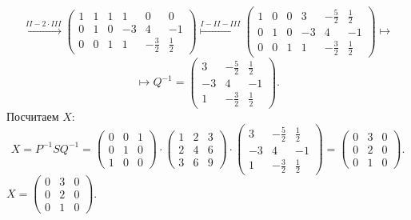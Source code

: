 \documentclass[a4paper,12pt]{article}
\begin{document}
$$ 
\overset{II - 2\cdot III}{\longmapsto}
\left(
\begin{array}{ccc|ccc}
1&1&1&1&0&0\\
0&1&0&-3&4&-1\\
0&0&1&1& -\frac{3}{2}&\frac{1}{2}
\end{array}
\right)
\overset{I - II - III}{\longmapsto}
\left(
\begin{array}{ccc|ccc}
1&0&0&3&-\frac{5}{2}&\frac{1}{2}\\
0&1&0&-3&4&-1\\
0&0&1&1& -\frac{3}{2}&\frac{1}{2}
\end{array}
\right)
\longmapsto
$$
$$
\longmapsto
Q^{-1}=
\left(
\begin{array}{ccc}
3&-\frac{5}{2}&\frac{1}{2}\\
-3&4&-1\\
1& -\frac{3}{2}&\frac{1}{2}
\end{array}
\right).
$$
Посчитаем $X$:
$$X=P^{-1}SQ^{-1}=
\begin{pmatrix}
0&0&1\\
0&1&0\\
1&0&0
\end{pmatrix}
\cdot
\begin{pmatrix}
1&2&3\\
2&4&6\\
3&6&9
\end{pmatrix}
\cdot
\begin{pmatrix}
3&-\frac{5}{2}&\frac{1}{2}\\
-3&4&-1\\
1& -\frac{3}{2}&\frac{1}{2}
\end{pmatrix}
=
\begin{pmatrix}
0&3&0\\
0&2&0\\
0&1&0
\end{pmatrix}.
$$
$
X=\begin{pmatrix}
0&3&0\\
0&2&0\\
0&1&0
\end{pmatrix}.
$
\end{document}
